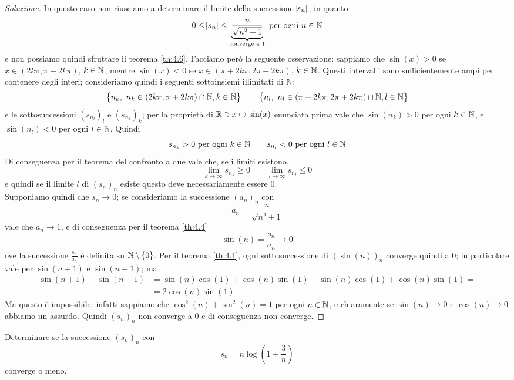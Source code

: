 \begin{proof}[Soluzione]
    In questo caso non riusciamo a determinare il limite della successione $\abs{s_n}$, in quanto 
    \[
    0\le \abs{s_n}\le \underbrace{\frac{n}{\sqrt{n^2+1}}}_{\text{converge a 1}} \ \text{per ogni} \ n\in\amsbb{N}
    \]
    e non possiamo quindi sfruttare il teorema \ref{th:4.6}. Facciamo però la seguente osservazione: sappiamo che $\sin(x)> 0$ se $x\in(2k\pi, \pi + 2k\pi)$, $k\in\amsbb{N}$, mentre $\sin(x)<0$ se $x\in(\pi + 2k\pi, 2\pi + 2k\pi)$, $k\in\amsbb{N}$. Questi intervalli sono sufficientemente ampi per contenere degli interi; consideriamo quindi i seguenti sottoinsiemi illimitati di $\amsbb{N}$:
    \[
    \left\{ n_k, \ n_k \in(2k\pi, \pi + 2k\pi) \cap \amsbb{N}, k \in\amsbb{N}\right\} \qquad \left\{ n_l, \ n_l \in(\pi + 2k\pi, 2\pi + 2k\pi) \cap \amsbb{N}, l \in\amsbb{N}\right\} 
    \]
    e le sottosuccessioni $(s_{n_l})_l$ e $(s_{n_k})_k$; per la proprietà di $\amsbb{R}\ni x \mapsto \sin(x)$ enunciata prima vale che $\sin(n_k)>0$ per ogni $k\in\amsbb{N}$, e $\sin(n_l)<0$ per ogni $l\in\amsbb{N}$. Quindi
    \[
    s_{n_k}>0 \ \text{per ogni} \ k\in\amsbb{N} \qquad s_{n_l}<0 \ \text{per ogni} \ l\in\amsbb{N}
    \]
    Di conseguenza per il teorema del confronto a due vale che, se i limiti esistono,
    \[
    \lim_{k\to\infty} s_{n_k}\ge 0 \qquad \lim_{l\to\infty} s_{n_l} \le 0
    \]
    e quindi se il limite $l$ di $(s_n)_n$ esiste questo deve necessariamente essere $0$.\\
    Supponiamo quindi che $s_n \to 0$; se consideriamo la successione $(a_n)_n$ con
    \[
    a_n = \frac{n}{\sqrt{n^2+1}}
    \]
    vale che $a_n \to 1$, e di conseguenza per il teorema \ref{th:4.4}
    \[
    \sin(n) = \frac{s_n}{a_n} \to 0
    \]
    ove la successione $\frac{s_n}{a_n}$ è definita su $\amsbb{N}\setminus \{0\}$. Per il teorema \ref{th:4.1}, ogni sottosuccessione di $(\sin(n))_n$ converge quindi a 0; in particolare vale per $\sin(n+1)$ e $\sin(n-1)$; ma
    \[
    \begin{split}
        \sin(n+1)-\sin(n-1) & = \sin(n)\cos(1) + \cos(n)\sin(1) - \sin(n)\cos(1)+\cos(n)\sin(1) = \\
        & = 2\cos(n)\sin(1)
    \end{split}
    \]
    Ma questo è impossibile: infatti sappiamo che $\cos^2(n) + \sin^2(n) = 1$ per ogni $n\in\amsbb{N}$, e chiaramente se $\sin(n)\to 0 $ e $\cos(n) \to 0$ abbiamo un assurdo. Quindi $(s_n)_n$ non converge a 0 e di conseguenza non converge.
\end{proof}
\begin{exercise}
    \label{ex:4.6}
    Determinare se la successione $(s_n)_n$ con
    \[
    s_n = n \log\left(1+\frac{3}{n}\right)
    \]
    converge o meno.
\end{exercise}
